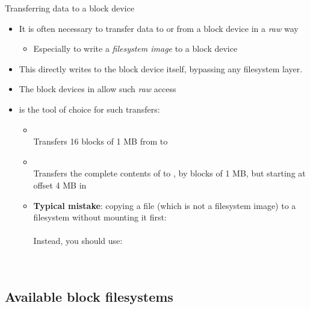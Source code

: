 \begin{frame}{Transferring data to a block device}
  \begin{itemize}
  \item It is often necessary to transfer data to or from a block
    device in a {\em raw} way
    \begin{itemize}
    \item Especially to write a {\em filesystem image} to a block
      device
    \end{itemize}
  \item This directly writes to the block device itself, bypassing any
    filesystem layer.
  \item The block devices in  allow such {\em raw} access
  \item {} is the tool of choice for such transfers:
    \begin{itemize}
    \item {}\\
      Transfers 16 blocks of 1 MB from  to
    \item {}\\
      Transfers the complete contents of  to
      , by blocks of 1 MB, but starting at offset 4 MB
      in 
    \item {\bf Typical mistake}: copying a file (which is not a
          filesystem image) to a filesystem without
          mounting it first:\\
      \\
      Instead, you should use:\\
      \\
      \\
    \end{itemize}
  \end{itemize}
\end{frame}

\subsection{Available block filesystems}

